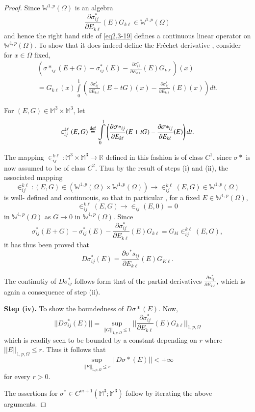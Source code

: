 \begin{proof}
 Since $\mathbb {W}^{1,p}( \Omega )$ is an algebra
  $$
 \frac{\partial \sigma^*_{i j}}{\partial E_{k \ell}} (E) G_{k \ell} \in
 \mathbb{W}^{1,p}(\Omega) 
 $$
 and hence the right hand side of \eqref{eq2.3-19} defines a continuous
 linear operator on $\mathbb {W}^{1,p}( \Omega )$. To show that it
 does indeed define the Fr\'{e}chet derivative , consider for $x \in
 \Omega $ fixed, 
 \begin{multline*}
 ( \sigma*_{ij}(E + G) - \sigma^*_{i j} (E) - \frac{\partial \sigma^*
   _{i j}}{\partial E _{k \ell}}(E ) G_{k \ell}) (x) \\
   = G_{k \ell}(x)
   \int\limits_{0}^{1} \left( \frac{\partial \sigma^* _{i j}}{\partial E _{k
     \ell}} ( E+ tG) (x)- \frac{\partial \sigma^* _{i j}}{\partial E
   _{k \ell}} ( E) (x)\right) dt. 
 \end{multline*}
 
 For $(E, G) \in \mathbb{M}^3 \times \mathbb{M}^3 $, let
 $$
 \in _{i j}^{k \ell} ( E , G ) \overset{\operatorname{def}}{=} \int\limits_0 ^1 \left(
 \frac{\partial \sigma*_{i j}}{\partial E _ {k \ell}}(E + tG) -
 \frac{\partial \sigma*_{i j}}{\partial E _{k \ell}} ( E)\right) dt. 
 $$

 The mapping $\in_{i j}^{k \ell}: \mathbb{M}^3 \times \mathbb{M}^3
 \to \mathbb {R}$ defined in this fashion is of class $C^1$, since $
 \sigma*$ is now assumed to be of class $C^2$. Thus by the result of
 steps (i) and (ii), the associated mapping 	 
 $$
 \in _{ij}^{k \ell}: (E , G ) \in ( \mathbb {W}^{1,p}( \Omega ) \times
 \mathbb {W}^{1,p}( \Omega )) \to \in _{i j}^{k \ell} ( E, G) \in
 \mathbb {W}^{1,p}( \Omega )  
 $$
 is well- defined and continuouis, so that in particular , for a fixed
 $ E \in \mathbb {W}^{1,p}(\Omega)$,	 
 $$
 \in _{i j} ^{k \ell} (E, G) \to \in _{i j} (E, 0) =0
 $$\pageoriginale
 in $\mathbb {W}^{1,p}( \Omega )$ as $G \to 0$ in $\mathbb {W}^{1,p}(
 \Omega )$. Since 
 $$
 \sigma^*_{i j} (E +G ) - \sigma^* _{ij}(E)- \frac{\partial
   \sigma^*_{ij}}{\partial E_{k \ell}} (E) G_{k \ell} = G_{kl}\in _{ij}^{k
   \ell}(E, G) , 
 $$
 it has thus been proved that 	
 $$
 D \sigma^*_{ij} (E) = \frac{\partial \sigma^*s_{i j}}{\partial E _{k
     \ell}}(E) G_{K \ell}.	 
 $$

 The continutiy of $D \sigma^*_{i j} $ follows form that of the partial
 derivatives $ \frac{\partial \sigma^* _{i j}}{\partial E _{k \ell}} $,
 which is again a consequence of step (ii). 

\noindent
\textbf{Step (iv).}
To show the boundedness of $D \sigma * (E)$. Now, 
 $$
  || D \sigma^*_{ij}(E) || = \sup_{|| G ||_{1,p, \Omega}\leq 1} ||
  \frac{\partial \sigma^*_{i j}}{\partial E _{k \ell}} (E) G_{k
    \ell}|| _{1,p,\Omega} 
 $$
 which is readily seen to be bounded by a constant depending on $r$
 where $|| E || _{1, p, \Omega}\leq r$. Thus it follows that 
 \begin{equation*}
   \sup _{|| E ||_{1,p,\Omega} \leq r}{|| D \sigma * (E) ||}< + \infty
   \tag{2.3-20}\label{eq2.3-20} 
 \end{equation*} 
 for every $r > 0$.
 
 The assertions for $\sigma^* \in C^{m+1} (\mathbb{M}^3; \mathbb{M}^3)$
 follow by iterating the above arguments. 
\end{proof} 

